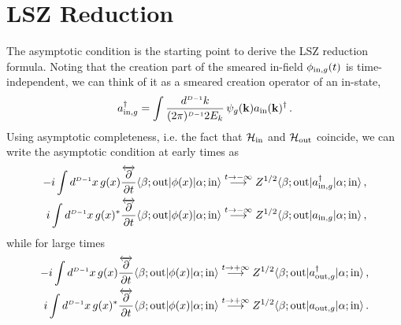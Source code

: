 \section{LSZ Reduction}
\label{sec:LSZRedux}

The asymptotic condition is the starting point to derive the LSZ reduction formula. Noting that
the creation part of the smeared in-field $\phi_{\mathrm{in},g}(t)$ is time-independent, we can 
think of it as a smeared creation operator of an in-state, 
\begin{equation}
    \label{eq:SmearedInCreation}
    a_{\mathrm{in},g}^\dagger = \int \frac{d^{\scriptscriptstyle{D-1}} k}{(2\pi)^{\scriptscriptstyle{D-1}} 2 E_k}\, 
    \psi_{g}(\mathbf{k}) a_{\mathrm{in}}(\mathbf{k})^\dagger\, .
\end{equation}
Using asymptotic completeness, i.e. the fact that $\mathcal{H}_{\mathrm{in}}$ and $\mathcal{H}_{\mathrm{out}}$ 
coincide, we can write the asymptotic condition at early times as
\begin{align}
    -i \int d^{\scriptscriptstyle{D-1}}x \, g(x) \frac{\overleftrightarrow{\partial}}{\partial t} \langle \beta; \mathrm{out} | \phi(x) | \alpha;\mathrm{in} \rangle
    \stackrel{t\to -\infty}{\longrightarrow} 
    Z^{1/2} \langle \beta; \mathrm{out} | a_{\mathrm{in},g}^\dagger | \alpha;\mathrm{in} \rangle \, ,\\
    i \int d^{\scriptscriptstyle{D-1}}x \, g(x)^* \frac{\overleftrightarrow{\partial}}{\partial t} \langle \beta; \mathrm{out} | \phi(x) | \alpha;\mathrm{in} \rangle
    \stackrel{t\to -\infty}{\longrightarrow} 
    Z^{1/2} \langle \beta; \mathrm{out} | a_{\mathrm{in},g} | \alpha;\mathrm{in} \rangle \, ,
\end{align}
while for large times 
\begin{align}
    -i \int d^{\scriptscriptstyle{D-1}}x \, g(x) \frac{\overleftrightarrow{\partial}}{\partial t} \langle \beta; \mathrm{out} | \phi(x) | \alpha;\mathrm{in} \rangle
    \stackrel{t\to +\infty}{\longrightarrow} 
    Z^{1/2} \langle \beta; \mathrm{out} | a_{\mathrm{out},g}^\dagger | \alpha;\mathrm{in} \rangle \, ,\\
    i \int d^{\scriptscriptstyle{D-1}}x \, g(x)^* \frac{\overleftrightarrow{\partial}}{\partial t} \langle \beta; \mathrm{out} | \phi(x) | \alpha;\mathrm{in} \rangle
    \stackrel{t\to +\infty}{\longrightarrow} 
    Z^{1/2} \langle \beta; \mathrm{out} | a_{\mathrm{out},g} | \alpha;\mathrm{in} \rangle \, .
\end{align}

